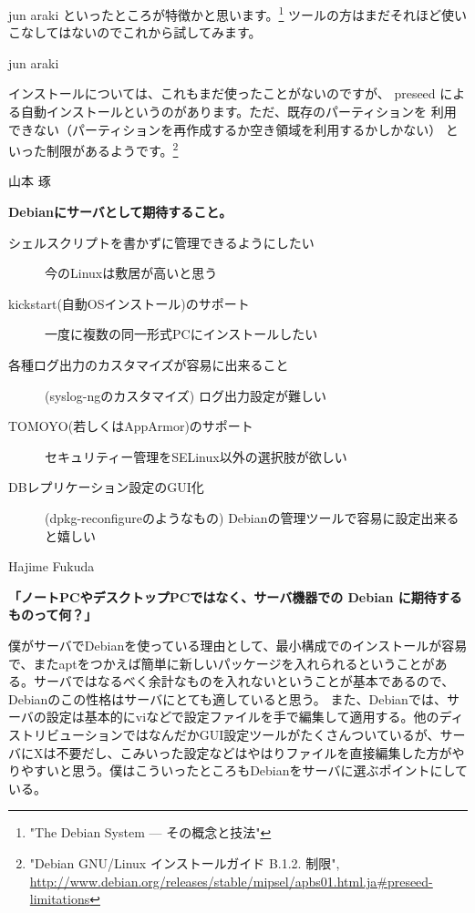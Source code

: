 \documentclass[cjk,dvipdfmx,12pt]{beamer}
\begin{document}
\begin{frame}{jun araki}
といったところが特徴かと思います。\footnote{"The Debian System --- その概念と技法"}
ツールの方はまだそれほど使いこなしてはないのでこれから試してみます。

\end{frame}\begin{frame}{jun araki}

インストールについては、これもまだ使ったことがないのですが、 preseed
による自動インストールというのがあります。ただ、既存のパーティションを
利用できない（パーティションを再作成するか空き領域を利用するかしかない）
といった制限があるようです。\footnote{ "Debian GNU/Linux インストールガイド B.1.2. 制限",
\url{http://www.debian.org/releases/stable/mipsel/apbs01.html.ja\#preseed-limitations}}

\end{frame}\begin{frame}{山本 琢}

\textbf{Debianにサーバとして期待すること。}

\begin{description}
 \item[シェルスクリプトを書かずに管理できるようにしたい]
	    今のLinuxは敷居が高いと思う
 \item[kickstart(自動OSインストール)のサポート]
	    一度に複数の同一形式PCにインストールしたい
 \item[各種ログ出力のカスタマイズが容易に出来ること ]
	    (syslog-ngのカスタマイズ)
	    ログ出力設定が難しい
 \item[TOMOYO(若しくはAppArmor)のサポート]
	    セキュリティー管理をSELinux以外の選択肢が欲しい
 \item[DBレプリケーション設定のGUI化 ]
	    (dpkg-reconfigureのようなもの)
	    Debianの管理ツールで容易に設定出来ると嬉しい
\end{description}

\end{frame}\begin{frame}{Hajime Fukuda}

\textbf{「ノートPCやデスクトップPCではなく、サーバ機器での Debian に期待するものって何？」}

僕がサーバでDebianを使っている理由として、最小構成でのインストールが容易で、またaptをつかえば簡単に新しいパッケージを入れられるということがある。サーバではなるべく余計なものを入れないということが基本であるので、Debianのこの性格はサーバにとても適していると思う。
また、Debianでは、サーバの設定は基本的にviなどで設定ファイルを手で編集して適用する。他のディストリビューションではなんだかGUI設定ツールがたくさんついているが、サーバにXは不要だし、こみいった設定などはやはりファイルを直接編集した方がやりやすいと思う。僕はこういったところもDebianをサーバに選ぶポイントにしている。


\end{frame}
\end{document}
